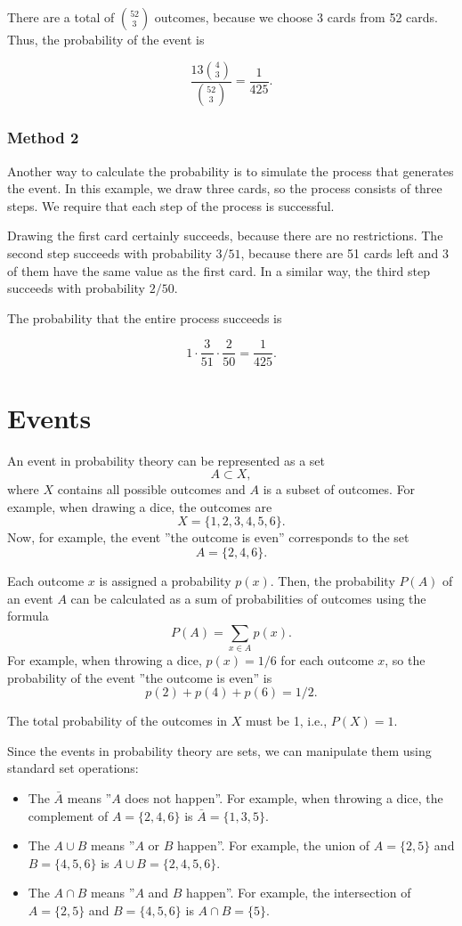 There are a total of $\binom{52}{3}$ outcomes,
because we choose 3 cards from 52 cards.
Thus, the probability of the event is

\[\frac{13 \binom{4}{3}}{\binom{52}{3}} = \frac{1}{425}.\]

\subsubsection*{Method 2}

Another way to calculate the probability is
to simulate the process that generates the event.
In this example, we draw three cards, so the process
consists of three steps.
We require that each step of the process is successful.

Drawing the first card certainly succeeds,
because there are no restrictions.
The second step succeeds with probability $3/51$,
because there are 51 cards left and 3 of them
have the same value as the first card.
In a similar way, the third step succeeds with probability $2/50$.

The probability that the entire process succeeds is

\[1 \cdot \frac{3}{51} \cdot \frac{2}{50} = \frac{1}{425}.\]

\section{Events}

An event in probability theory can be represented as a set
\[A \subset X,\]
where $X$ contains all possible outcomes
and $A$ is a subset of outcomes.
For example, when drawing a dice, the outcomes are
\[X = \{1,2,3,4,5,6\}.\]
Now, for example, the event ''the outcome is even''
corresponds to the set
\[A = \{2,4,6\}.\]

Each outcome $x$ is assigned a probability $p(x)$.
Then, the probability $P(A)$ of an event
$A$ can be calculated as a sum
of probabilities of outcomes using the formula
\[P(A) = \sum_{x \in A} p(x).\]
For example, when throwing a dice,
$p(x)=1/6$ for each outcome $x$,
so the probability of the event
''the outcome is even'' is
\[p(2)+p(4)+p(6)=1/2.\]

The total probability of the outcomes in $X$ must
be 1, i.e., $P(X)=1$.

Since the events in probability theory are sets,
we can manipulate them using standard set operations:

\begin{itemize}
    \item The  $\bar A$ means
          ''$A$ does not happen''.
          For example, when throwing a dice,
          the complement of $A=\{2,4,6\}$ is
          $\bar A = \{1,3,5\}$.
    \item The  $A \cup B$ means
          ''$A$ or $B$ happen''.
          For example, the union of
          $A=\{2,5\}$
          and $B=\{4,5,6\}$ is
          $A \cup B = \{2,4,5,6\}$.
    \item The  $A \cap B$ means
          ''$A$ and $B$ happen''.
          For example, the intersection of
          $A=\{2,5\}$ and $B=\{4,5,6\}$ is
          $A \cap B = \{5\}$.
\end{itemize}

